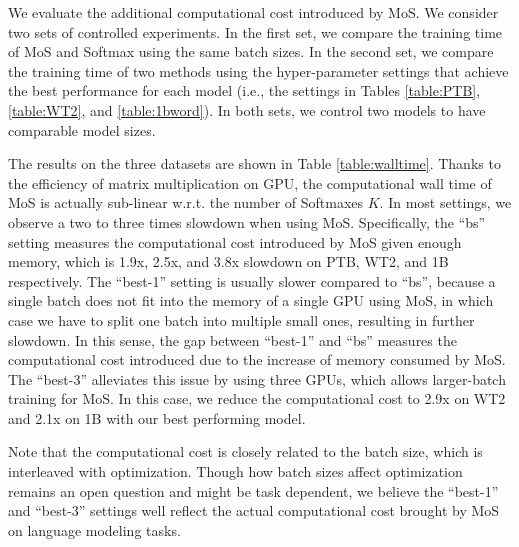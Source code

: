 We evaluate the additional computational cost introduced by MoS. We consider two sets of controlled experiments. In the first set, we compare the training time of MoS and Softmax using the same batch sizes. In the second set, we compare the training time of two methods using the hyper-parameter settings that achieve the best performance for each model (i.e., the settings in Tables \ref{table:PTB}, \ref{table:WT2}, and \ref{table:1bword}). In both sets, we control two models to have comparable model sizes.

The results on the three datasets are shown in Table \ref{table:walltime}. Thanks to the efficiency of matrix multiplication on GPU, the computational wall time of MoS is actually sub-linear w.r.t. the number of Softmaxes $K$. In most settings, we observe a two to three times slowdown when using MoS. Specifically, the ``bs'' setting measures the computational cost introduced by MoS given enough memory, which is 1.9x, 2.5x, and 3.8x slowdown on PTB, WT2, and 1B respectively. The ``best-1'' setting is usually slower compared to ``bs'', because a single batch does not fit into the memory of a single GPU using MoS, in which case we have to split one batch into multiple small ones, resulting in further slowdown. In this sense, the gap between ``best-1'' and ``bs'' measures the computational cost introduced due to the increase of memory consumed by MoS. 
The ``best-3'' alleviates this issue by using three GPUs, which allows larger-batch training for MoS. In this case, we reduce the computational cost to 2.9x on WT2 and 2.1x on 1B with our best performing model.

Note that the computational cost is closely related to the batch size, which is interleaved with optimization. Though how batch sizes affect optimization remains an open question and might be task dependent, we believe the ``best-1'' and ``best-3'' settings well reflect the actual computational cost brought by MoS on language modeling tasks.

